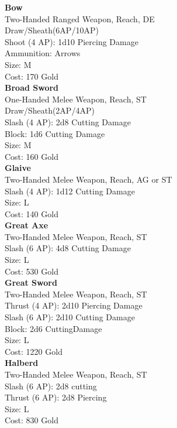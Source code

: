 \textbf{Bow}\label{weapon:bow}\\
Two-Handed Ranged Weapon,  Reach, DE\\
Draw/Sheath(6AP/10AP)\\
Shoot (4 AP): 1d10 Piercing Damage\\
Ammunition: Arrows\\
Size: M\\
Cost: 170 Gold\\

\textbf{Broad Sword}\label{weapon:broadSword}\\
One-Handed Melee Weapon,  Reach, ST\\
Draw/Sheath(2AP/4AP)\\
Slash (4 AP): 2d8 Cutting Damage\\
Block: 1d6 Cutting Damage\\
Size: M\\
Cost: 160 Gold\\

\textbf{Glaive}\label{weapon:glaive}\\
Two-Handed Melee Weapon,  Reach, AG or ST\\
Slash (4 AP): 1d12 Cutting Damage\\
Size: L\\
Cost: 140 Gold\\

\textbf{Great Axe}\label{weapon:greatAxe}\\
Two-Handed Melee Weapon,  Reach, ST\\
Slash (6 AP): 4d8 Cutting Damage\\
Size: L\\
Cost: 530 Gold\\

\textbf{Great Sword}\label{weapon:greatSword}\\
Two-Handed Melee Weapon,  Reach, ST\\
Thrust (4 AP): 2d10 Piercing Damage\\
Slash (6 AP): 2d10 Cutting Damage\\
Block: 2d6 CuttingDamage\\
Size: L\\
Cost: 1220 Gold\\

\textbf{Halberd}\label{weapon:halberd}\\
Two-Handed Melee Weapon,  Reach, ST\\
Slash (6 AP): 2d8 cutting\\
Thrust (6 AP): 2d8 Piercing\\
Size: L\\
Cost: 830 Gold\\

